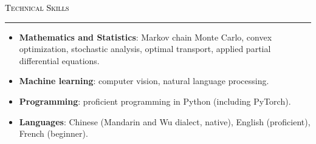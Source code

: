 \documentclass{resume} %
\renewenvironment{rSection}[1]{
\sectionskip
\textcolor{black}{\textsc{#1}}
\sectionlineskip
\hrule
\begin{list}{}{
\setlength{\leftmargin}{1.5em}
}
\item[]
}{
\end{list}
}
\begin{document}
    
\begin{rSection}{Technical Skills} \itemsep -2pt
\begin{itemize}[leftmargin=0in]
    \item \textbf{Mathematics and Statistics}: Markov chain Monte Carlo, convex optimization, stochastic analysis, optimal transport, applied partial differential equations.
    \item \textbf{Machine learning}: computer vision, natural language processing.
    \item \textbf{Programming}: proficient programming in Python (including PyTorch).
    \item \textbf{Languages}: Chinese (Mandarin and Wu dialect, native), English (proficient), French (beginner).
\end{itemize}


\end{rSection}
\end{document}
